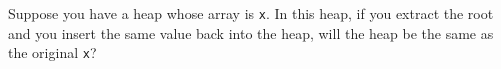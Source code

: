   Suppose you have a heap whose array is \verb!x!.
  In this heap, if you extract the root and you insert the same value back
  into the heap, will the heap be the same as the original \verb!x!?
